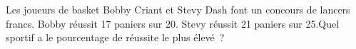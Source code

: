 \documentclass[exercice]{thedocument}%
\begin{document}
%
Les joueurs de basket Bobby Criant et Stevy Dash font un concours
de lancers francs. Bobby réussit 17 paniers sur 20. Stevy réussit 21 paniers
sur 25.\vskip5pt\noindent Quel sportif a le pourcentage de réussite le plus
élevé~?
\end{document}
